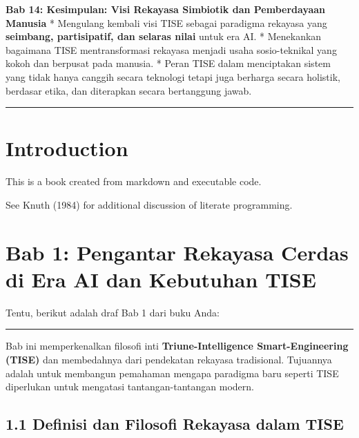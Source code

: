 \documentclass[
  letterpaper,
  DIV=11,
  numbers=noendperiod]{scrreprt}
\begin{document}
\textbf{Bab 14: Kesimpulan: Visi Rekayasa Simbiotik dan Pemberdayaan
Manusia} * Mengulang kembali visi TISE sebagai paradigma rekayasa yang
\textbf{seimbang, partisipatif, dan selaras nilai} untuk era AI. *
Menekankan bagaimana TISE mentransformasi rekayasa menjadi usaha
sosio-teknikal yang kokoh dan berpusat pada manusia. * Peran TISE dalam
menciptakan sistem yang tidak hanya canggih secara teknologi tetapi juga
berharga secara holistik, berdasar etika, dan diterapkan secara
bertanggung jawab.

\begin{center}\rule{0.5\linewidth}{0.5pt}\end{center}


\chapter{Introduction}\label{introduction}

This is a book created from markdown and executable code.

See Knuth (1984) for additional discussion of literate programming.


\chapter{\texorpdfstring{\textbf{Bab 1: Pengantar Rekayasa Cerdas di Era
AI dan Kebutuhan
TISE}}{Bab 1: Pengantar Rekayasa Cerdas di Era AI dan Kebutuhan TISE}}\label{bab-1-pengantar-rekayasa-cerdas-di-era-ai-dan-kebutuhan-tise}

Tentu, berikut adalah draf Bab 1 dari buku Anda:

\begin{center}\rule{0.5\linewidth}{0.5pt}\end{center}

Bab ini memperkenalkan filosofi inti \textbf{Triune-Intelligence
Smart-Engineering (TISE)} dan membedahnya dari pendekatan rekayasa
tradisional. Tujuannya adalah untuk membangun pemahaman mengapa
paradigma baru seperti TISE diperlukan untuk mengatasi
tantangan-tantangan modern.

\section{\texorpdfstring{\textbf{1.1 Definisi dan Filosofi Rekayasa
dalam
TISE}}{1.1 Definisi dan Filosofi Rekayasa dalam TISE}}\label{definisi-dan-filosofi-rekayasa-dalam-tise}
\end{document}
